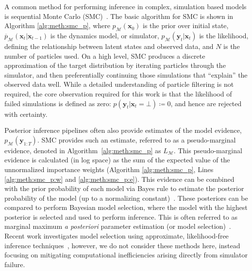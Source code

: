 A common method for performing inference in complex, simulation based models is sequential Monte Carlo (SMC)~\citep{doucet2001introduction}.
The basic algorithm for SMC is shown in Algorithm \ref{alg:meth:smc_p}, where $p_{\mathcal{M}}(\mathbf{x}_0)$ is the prior over initial state, $\overline{p}_{\mathcal{M}}(\mathbf{x}_t | \mathbf{x}_{t-1})$ is the dynamics model, or simulator, $p_{\mathcal{M}}(\mathbf{y}_t | \mathbf{x}_t)$ is the likelihood, defining the relationship between latent states and observed data, and $N$ is the number of particles used.
On a high level, SMC produces a discrete approximation of the target distribution by iterating particles through the simulator, and then preferentially continuing those simulations that ``explain'' the observed data well.
While a detailed understanding of particle filtering is not required, the core observation required for this work is that the likelihood of failed simulations is defined as zero: $p(\mathbf{y}_t | \mathbf{x}_t = \bot) \coloneqq 0$, and hence are rejected with certainty.

Posterior inference pipelines often also provide estimates of the model evidence, $p_{\mathcal{M}}(\mathbf{y}_{1:T})$.
SMC provides such an estimate, referred to as a pseudo-marginal evidence, denoted in Algorithm~\ref{alg:meth:smc_p} as $L_{\mathcal{M}}$.
This pseudo-marginal evidence is calculated (in log space) as the sum of the expected value of the unnormalized importance weights (Algorithm \ref{alg:meth:smc_p}, Lines \ref{alg:meth:smc_p:w} and \ref{alg:meth:smc_p:e}).
This evidence can be combined with the prior probability of each model via Bayes rule to estimate the posterior probability of the model (up to a normalizing constant)~\citep{mackay2003information}.
These posteriors can be compared to perform Bayesian model selection, where the model with the highest posterior is selected and used to perform inference.
This is often referred to as marginal maximum \emph{a posteriori} parameter estimation (or model selection)~\citep{doucet2002marginal, kantas2015particle}.
Recent work investigates model selection using approximate, likelihood-free inference techniques~\citep{papamakarios2019sequential, lueckmann2019likelihood}, however, we do not consider these methods here, instead focusing on mitigating computational inefficiencies arising directly from simulator failure.

